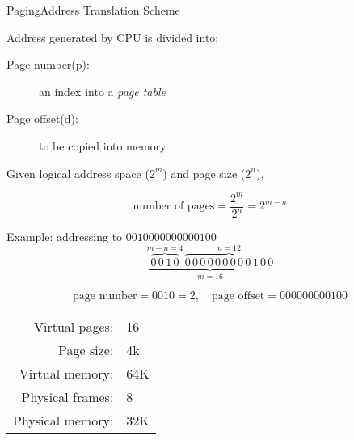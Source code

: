 \begin{frame}{Paging}{Address Translation Scheme}
  \begin{block}{Address generated by CPU is divided into:}
    \begin{description}
    \item[Page number(p):] an index into a \emph{page table}
    \item[Page offset(d):] to be copied into memory
    \end{description}
  \end{block}
  Given \alert{logical address space} ($2^m$) and \alert{page size} ($2^n$),
  \begin{small}
    $$\text{number of pages}=\frac{2^m}{2^n}=2^{m-n}$$
  \end{small}
  \begin{block}{Example: addressing to $0010000000000100$}
    $$\underbrace{\overbrace{0\,0\,1\,0}^{m-n=4}\,\overbrace{0\,0\,0\,0\,0\,0\,0\,0\,0\,1\,0\,0}^{n=12}}_{m=16}$$
    \begin{small}
      $$\text{page number}=0010=2, \quad \text{page offset}=000000000100$$
    \end{small}
  \end{block}
\end{frame}

\begin{frame}
  \begin{varwidth}{.65\textwidth}
    \begin{center}
    \end{center}
    \label{fig:paging}
  \end{varwidth}\hfill
  \begin{varwidth}{.35\textwidth}
    \begin{small}
      \begin{tabular}{rl}
        Virtual pages:  &16\\
        Page size:      &4k\\
        Virtual memory:& 64K\\
        Physical frames:&8\\
        Physical memory:&32K
      \end{tabular}
    \end{small}
  \end{varwidth}
\end{frame}

